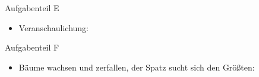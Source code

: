 \documentclass{beamer}
\begin{document}
\begin{frame}{Aufgabenteil E}
\begin{itemize}
\item Veranschaulichung:
\end{itemize}
\begin{figure}
    \centering
\end{figure}
\end{frame}

\begin{frame}{Aufgabenteil F}
\begin{itemize}
\item Bäume wachsen und zerfallen, der Spatz sucht sich den Größten:
\end{itemize}
\begin{figure}
    \centering
\end{figure}
\end{frame}
\end{document}
